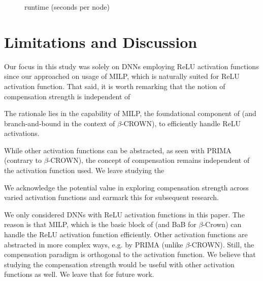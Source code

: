 \begin{figure}[h!]
	\centering
	\caption{runtime (seconds per node)}
	\label{fig2}
\end{figure}





\section{Limitations and Discussion}
\label{Discussion}


Our focus in this study was solely on DNNs employing ReLU activation functions since our approached on usage of MILP, which is naturally suited for ReLU activation function. That said, it is worth remarking that the notion of compensation strength is independent of  

The rationale lies in the capability of MILP, the foundational component of {\toolname} (and branch-and-bound in the context of $\beta$-CROWN), to efficiently handle ReLU activations. 

While other activation functions can be abstracted, as seen with PRIMA (contrary to $\beta$-CROWN), the concept of compensation remains independent of the activation function used. We leave studying the 

We acknowledge the potential value in exploring compensation strength across varied activation functions and earmark this for subsequent research.


We only considered DNNs with ReLU activation functions in this paper. The reason is that MILP, which is the basic block of {\toolname} (and BaB for $\beta$-Crown) can handle the ReLU activation function efficiently. Other activation functions are abstracted in more complex ways, e.g. by PRIMA (unlike $\beta$-CROWN). Still, the compensation paradigm is  orthogonal to the activation function. We believe that studying the compensation strength would be useful with other activation functions as well. We leave that for future work. 

